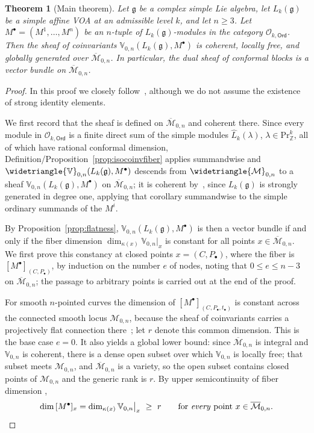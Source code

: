 \documentclass[12pt,a4paper,reqno]{amsart}
\numberwithin{equation}{section}
\newtheorem{theorem}{Theorem}[section]
\theoremstyle{definition}
\newcommand{\g}{\mathfrak{g}}
\newcommand{\Z}{\mathbb{Z}}
\newcommand{\M}{\mathcal{M}}
\def\O{\mathcal{O}}
\def\Ord{\mathsf{Ord}}
\def\Pr{\mathrm{Pr}}
\def\la{\lambda}
\def\VV{\mathbb{V}}
\begin{document}
\begin{theorem}[Main theorem]\label{thm:mainA}
Let $\g$ be a complex simple Lie algebra, let $L_k(\g)$ be a simple affine VOA at an admissible level $k$, and let $n\geq 3$. Let $M^\bullet=(M^1,\dots, M^n)$ be an $n$-tuple of $L_k(\g)$-modules in the category $\O_{k,\Ord}$. Then the sheaf of coinvariants $\VV_{0,n}(L_k(\g),M^\bullet)$ is coherent, locally free, and globally generated over $\overline{\M}_{0,n}$. In particular, the dual sheaf of conformal blocks is a vector bundle on $\overline{\M}_{0,n}$.
\end{theorem}
\begin{proof}
    In this proof we closely follow~\cite[Corollary 5.2.6]{DGK2}, although we do not assume the existence of strong identity elements.

    We first record that the sheaf is defined on $\overline{\M}_{0,n}$ and coherent there. Since every module in $\O_{k,\Ord}$ is a finite direct sum of the simple modules $\hat{L}_k(\la)$, $\la\in\Pr^k_\Z$, all of which have rational conformal dimension, Definition/Proposition~\ref{prop:isocoinvfiber} applies summandwise and $\widetriangle{\VV}_{0,n}(L_k(\g),M^\bullet)$ descends from $\widetriangle{\M}_{0,n}$ to a sheaf $\VV_{0,n}(L_k(\g),M^\bullet)$ on $\overline{\M}_{0,n}$; it is coherent by~\cite[Corollary A]{DG}, since $L_k(\g)$ is strongly generated in degree one, applying that corollary summandwise to the simple ordinary summands of the $M^i$.

    By Proposition~\ref{prop:flatness}, $\VV_{0,n}(L_k(\g),M^\bullet)$ is then a vector bundle if and only if the fiber dimension $\dim_{\kappa(x)}\VV_{0,n}|_x$ is constant for all points $x \in \overline{\M}_{0,n}$. We first prove this constancy at closed points $x=(C,P_\bullet)$, where the fiber is $[M^\bullet]_{(C,P_\bullet)}$, by induction on the number $e$ of nodes, noting that $0\leq e\leq n-3$ on $\overline{\M}_{0,n}$; the passage to arbitrary points is carried out at the end of the proof.

    For smooth $n$-pointed curves the dimension of $[M^\bullet]_{(C, P_\bullet, t_\bullet)}$ is constant across the connected smooth locus $\M_{0,n}$, because the sheaf of coinvariants carries a projectively flat connection there~\cite[Main theorem]{DGT1}; let $r$ denote this common dimension. This is the base case $e=0$. It also yields a global lower bound: since $\overline{\M}_{0,n}$ is integral and $\VV_{0,n}$ is coherent, there is a dense open subset over which $\VV_{0,n}$ is locally free; that subset meets $\M_{0,n}$, and $\overline{\M}_{0,n}$ is a variety, so the open subset contains closed points of $\M_{0,n}$ and the generic rank is $r$. By upper semicontinuity of fiber dimension \cite[Exercise II.5.8]{Hartshorne},
    \begin{equation}\label{eq:lowerbound}
    \dim\,[M^\bullet]_{x}=\dim_{\kappa(x)}\VV_{0,n}\big|_x\ \geq\ r\qquad\text{for \emph{every} point }x\in\overline{\M}_{0,n}.
    \end{equation}


\end{proof}
\end{document}
